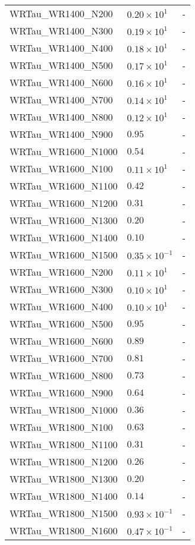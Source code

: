 \begin{longtable}[c]{| C{.35\textwidth} | C{.15\textwidth} | C{.1\textwidth}|}
    WRTau\_WR1400\_N200 & $0.20\times10^{1}$ & - \\
    WRTau\_WR1400\_N300 & $0.19\times10^{1}$ & - \\
    WRTau\_WR1400\_N400 & $0.18\times10^{1}$ & - \\
    WRTau\_WR1400\_N500 & $0.17\times10^{1}$ & - \\
    WRTau\_WR1400\_N600 & $0.16\times10^{1}$ & - \\
    WRTau\_WR1400\_N700 & $0.14\times10^{1}$ & - \\
    WRTau\_WR1400\_N800 & $0.12\times10^{1}$ & - \\
    WRTau\_WR1400\_N900 & $0.95$ & - \\ \hline
    WRTau\_WR1600\_N1000 & $0.54$ & - \\
    WRTau\_WR1600\_N100 & $0.11\times10^{1}$ & - \\
    WRTau\_WR1600\_N1100 & $0.42$ & - \\
    WRTau\_WR1600\_N1200 & $0.31$ & - \\
    WRTau\_WR1600\_N1300 & $0.20$ & - \\
    WRTau\_WR1600\_N1400 & $0.10$ & - \\
    WRTau\_WR1600\_N1500 & $0.35\times10^{-1}$ & - \\
    WRTau\_WR1600\_N200 & $0.11\times10^{1}$ & - \\
    WRTau\_WR1600\_N300 & $0.10\times10^{1}$ & - \\
    WRTau\_WR1600\_N400 & $0.10\times10^{1}$ & - \\
    WRTau\_WR1600\_N500 & $0.95$ & - \\
    WRTau\_WR1600\_N600 & $0.89$ & - \\
    WRTau\_WR1600\_N700 & $0.81$ & - \\
    WRTau\_WR1600\_N800 & $0.73$ & - \\
    WRTau\_WR1600\_N900 & $0.64$ & - \\ \hline
    WRTau\_WR1800\_N1000 & $0.36$ & - \\
    WRTau\_WR1800\_N100 & $0.63$ & - \\
    WRTau\_WR1800\_N1100 & $0.31$ & - \\
    WRTau\_WR1800\_N1200 & $0.26$ & - \\
    WRTau\_WR1800\_N1300 & $0.20$ & - \\
    WRTau\_WR1800\_N1400 & $0.14$ & - \\
    WRTau\_WR1800\_N1500 & $0.93\times10^{-1}$ & - \\
    WRTau\_WR1800\_N1600 & $0.47\times10^{-1}$ & - \\

\end{longtable}
